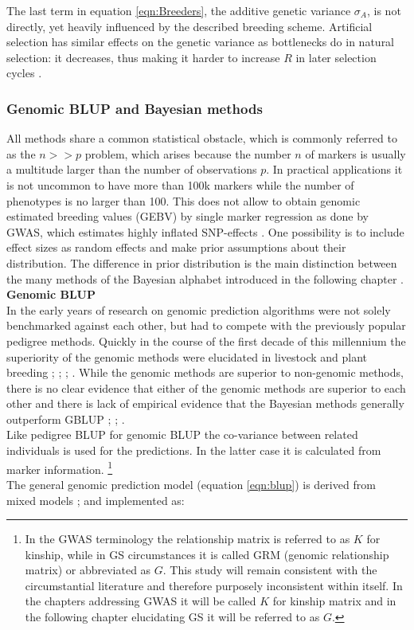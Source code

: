The last term in equation \ref{eqn:Breeders}, the additive genetic variance $\sigma_A$, is
not directly, yet heavily influenced by the described breeding scheme. Artificial
selection has similar effects on the genetic variance as bottlenecks do in natural
selection: it decreases, thus making it harder to increase $R$ in later selection cycles
\cite{walsh2018}.

\subsubsection{Genomic BLUP and Bayesian methods}\label{blup:bayes}

All methods share a common statistical obstacle, which is commonly referred to as the
$n >> p$ problem, which arises because the number $n$ of markers is usually a multitude
larger than the number of observations $p$. In practical applications it is not uncommon
to have more than 100k markers while the number of phenotypes is no larger than 100. This
does not allow to obtain genomic estimated breeding values (GEBV) by single marker
regression as done by GWAS, which estimates highly inflated SNP-effects
\cite{korte2013advantages}. One possibility is to include effect sizes as random effects
and make prior assumptions about their distribution. The difference in prior distribution
is the main distinction between the many methods of the Bayesian alphabet introduced in
the following chapter \cite{gianola2013}.\\

\noindent
\textbf{Genomic BLUP} \\ In the early years of research on genomic prediction algorithms
were not solely benchmarked against each other, but had to compete with the previously
popular pedigree methods. Quickly in the course of the first decade of this millennium the
superiority of the genomic methods were elucidated in livestock and plant breeding
\cite{habier2007impact}; \cite{vanraden2008efficient}; \cite{vanraden2008reliability}; \cite{harris2009genomic}. While the genomic methods are superior to non-genomic methods,
there is no clear evidence that either of the genomic methods are superior to each other
and there is lack of empirical evidence that the Bayesian methods generally outperform
GBLUP \cite{moser2009comparison}; \cite{bernardo2010breeding}; \cite{azodi2019}. \\
Like pedigree BLUP for genomic BLUP the co-variance between related individuals is used
for the predictions. In the latter case it is calculated from marker information.
\footnote{In the GWAS terminology the relationship matrix is referred to as $K$ for
  kinship, while in GS circumstances it is called GRM (genomic relationship matrix) or
  abbreviated as $G$. This study will remain consistent with the circumstantial literature
  and therefore purposely inconsistent within itself. In the chapters addressing GWAS
  it will be called $K$ for kinship matrix and in the following chapter elucidating GS
  it will be referred to as $G$.}
\\
The general genomic prediction model (equation \ref{eqn:blup}) is derived from mixed
models \cite{henderson1975best}; \cite{vanraden2008efficient} and implemented as:


